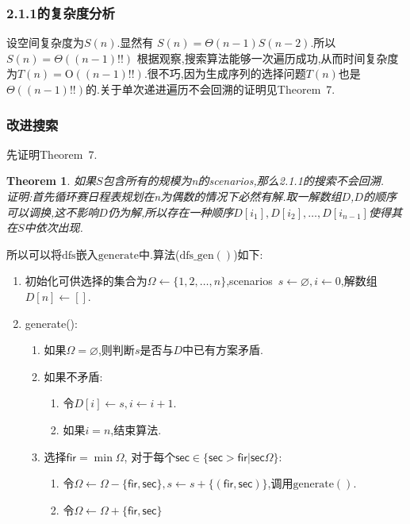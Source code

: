 \documentclass[UTF8]{ctexart}
\newcommand{\brc}[1]{\left({{}#1}\right)}
\newcommand{\gro}{\mathrm{O}}
\newtheorem{tem}[dft]{Theorem}
\begin{document}
\subsubsection{2.1.1的复杂度分析}
设空间复杂度为$S(n)$.显然有
$S(n) = \Theta(n-1)S(n-2)$.所以$S(n) = \Theta\brc{(n-1)!!}$
根据观察,搜索算法能够一次遍历成功,从而时间复杂度为$T(n) = \gro((n-1)!!)$.很不巧,因为生成序列的选择问题$T(n)$也是$\Theta((n-1)!!)$的.关于单次递进遍历不会回溯的证明见Theorem\ 7.


\subsubsection{改进搜索}
先证明Theorem\ 7.
\begin{tem}
    如果$S$包含所有的规模为n的scenarios,那么2.1.1的搜索不会回溯.\\
证明:首先循环赛日程表规划在n为偶数的情况下必然有解.取一解数组$D$,$D$的顺序可以调换,这不影响$D$仍为解,所以存在一种顺序$D[i_1],D[i_2],\dots, D[i_{n-1}]$使得其在$S$中依次出现.
\end{tem}


所以可以将$\mathrm{dfs}$嵌入$\mathrm{generate}$中.算法($\mathrm{dfs\_gen}()$)如下:
\begin{enumerate}[]
    \item 初始化可供选择的集合为$\Omega \leftarrow \{1, 2, \dots, n\}$,scenarios\ $s\leftarrow\varnothing, i\leftarrow 0$,解数组$D[n] \leftarrow []$.
    \item generate():
    \begin{enumerate}[1]
        \item 如果$\Omega = \varnothing$,则判断$s$是否与$D$中已有方案矛盾.
        \item 如果不矛盾:
        \begin{enumerate}[1]
            \item 令$D[i]\leftarrow s, i\leftarrow i + 1$.
            \item 如果$i = n$,结束算法. 
        \end{enumerate}
        \item 选择$\mathsf{fir} = \min \Omega$, 对于每个$\mathsf{sec} \in \{\mathsf{sec}>\mathsf{fir}| \mathsf{sec} \Omega\}$:
        \begin{enumerate}[1]
            \item 令$\Omega \leftarrow \Omega - \{\mathsf{fir}, \mathsf{sec}\}, s \leftarrow s + \{(\mathsf{fir},\mathsf{sec})\}$,调用$\mathrm{generate}()$.
            \item 令$\Omega \leftarrow \Omega + \{\mathsf{fir}, \mathsf{sec}\}$
        \end{enumerate}
    \end{enumerate}
\end{enumerate}
\end{document}
